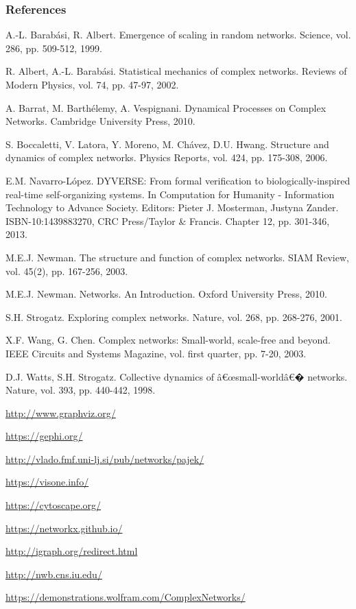 \subsubsection{References}

A.-L. Barab\'asi, R. Albert.
Emergence of scaling in random networks.
Science, vol. 286, pp. 509-512, 1999.


R. Albert, A.-L. Barab\'asi.
Statistical mechanics of complex networks.
Reviews of Modern Physics, vol. 74, pp. 47-97, 2002.


A. Barrat, M. Barth\'elemy, A. Vespignani. 
Dynamical Processes on Complex Networks. 
Cambridge University Press, 2010.

S. Boccaletti, V. Latora, Y. Moreno, M. Ch\'avez, D.U. Hwang. 
Structure and dynamics of complex networks.
Physics Reports, vol. 424, pp. 175-308, 2006.


E.M. Navarro-L\'opez.
DYVERSE: From formal verification to biologically-inspired real-time self-organizing systems. In Computation for Humanity - Information Technology to Advance Society. Editors: Pieter J. Mosterman, Justyna Zander. ISBN-10:1439883270, CRC Press/Taylor & Francis. Chapter 12, pp. 301-346, 2013.
 
M.E.J. Newman.
The structure and function of complex networks.
SIAM Review, vol. 45(2), pp. 167-256, 2003.

M.E.J. Newman.
Networks. An Introduction.
Oxford University Press, 2010.


S.H. Strogatz.
Exploring complex networks.
Nature, vol. 268, pp. 268-276, 2001.

X.F. Wang, G. Chen.
Complex networks: Small-world, scale-free and beyond.
IEEE Circuits and Systems Magazine, vol. first quarter, pp. 7-20, 2003.

D.J. Watts, S.H. Strogatz.
Collective dynamics of â€œsmall-worldâ€� networks.
Nature, vol. 393, pp. 440-442, 1998.
 
\url{http://www.graphviz.org/} 

\url{https://gephi.org/} 

\url{http://vlado.fmf.uni-lj.si/pub/networks/pajek/} 

\url{https://visone.info/} 

\url{https://cytoscape.org/} 

\url{https://networkx.github.io/} 

\url{http://igraph.org/redirect.html} 

\url{http://nwb.cns.iu.edu/} 

\url{https://demonstrations.wolfram.com/ComplexNetworks/} 

